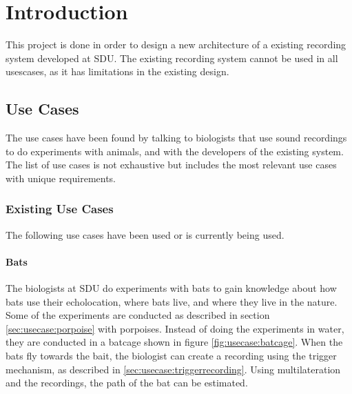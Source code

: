 \chapter{Introduction}

This project is done in order to design a new architecture of a existing recording system developed at SDU.  The existing recording system cannot be used in all usescases, as it has limitations in the existing design. 

\section{Use Cases}
The use cases have been found by talking to biologists that use sound recordings to do experiments with animals, and with the developers of the existing system. The list of use cases is not exhaustive but includes the most relevant use cases with unique requirements.

\subsection{Existing Use Cases}
The following use cases have been used or is currently being used.

\subsubsection{Bats} \label{sec:usecase:bats}
The biologists at SDU do experiments with bats to gain knowledge about how bats use their echolocation, where bats live, and where they live in the nature.
Some of the experiments are conducted as described in section \ref{sec:usecase:porpoise} with porpoises. Instead of doing the experiments in water, they are conducted in a batcage shown in figure \ref{fig:usecase:batcage}. When the bats fly towards the bait, the biologist can create a recording using the trigger mechanism, as described in \ref{sec:usecase:triggerrecording}. Using multilateration and the recordings, the path of the bat can be estimated.

